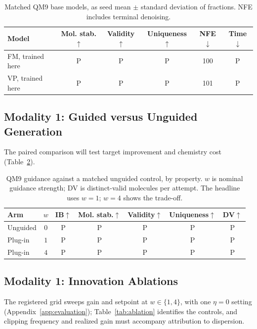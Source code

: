 \documentclass{article}
\newcommand{\pend}{\textcolor{black!60}{\textsf{P}}}
\begin{document}
\begin{table}[!htbp]
\centering\small
\caption{Matched QM9 base models, as seed mean $\pm$ standard deviation of fractions. NFE includes terminal denoising.}
\label{tab:fmvd}
\begin{tabular}{lccccc}
\toprule
Model & Mol. stab.$\uparrow$ & Validity$\uparrow$ & Uniqueness$\uparrow$ & NFE$\downarrow$ & Time$\downarrow$\\
\midrule
FM, trained here & \pend & \pend & \pend & 100 & \pend\\
VP, trained here & \pend & \pend & \pend & 101 & \pend\\
\bottomrule
\end{tabular}
\end{table}


\subsection{Modality 1: Guided versus Unguided Generation}\label{sec:guidworks}
The paired comparison will test target improvement and chemistry cost (Table~\ref{tab:guidance}).

\begin{table}[!htbp]
\centering\small
\caption{QM9 guidance against a matched unguided control, by property. $w$ is nominal guidance strength; DV is distinct-valid molecules per attempt. The headline uses $w=1$; $w=4$ shows the trade-off.}
\label{tab:guidance}
\begin{tabular}{lcccccc}
\toprule
Arm & $w$ & IB$\uparrow$ & Mol. stab.$\uparrow$ & Validity$\uparrow$ & Uniqueness$\uparrow$ & DV$\uparrow$\\
\midrule
Unguided & $0$ & \pend & \pend & \pend & \pend & \pend\\
Plug-in & $1$ & \pend & \pend & \pend & \pend & \pend\\
Plug-in & $4$ & \pend & \pend & \pend & \pend & \pend\\
\bottomrule
\end{tabular}
\end{table}


\subsection{Modality 1: Innovation Ablations}\label{sec:ablations}
The registered grid sweeps gain and setpoint at $w\in\{1,4\}$, with one $\eta=0$ setting (Appendix~\ref{app:evaluation}); Table~\ref{tab:ablation} identifies the controls, and clipping frequency and realized gain must accompany attribution to dispersion.
\end{document}
